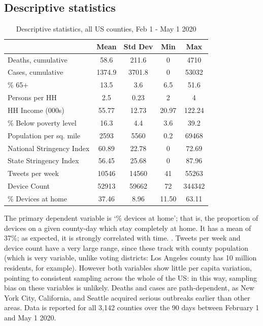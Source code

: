 \documentclass{article}
\begin{document}
\subsection{Descriptive statistics}\label{descrip}
\begin{singlespace}
    \begin{table}[!htb]
    \centering  
  \caption{Descriptive statistics, all US counties, Feb 1 - May 1 2020}
  \begin{tabular}{lcccc}
    \toprule
     & Mean & Std Dev & Min & Max\\
    \midrule
    Deaths, cumulative & 58.6 & 211.6 & 0 & 4710\\
    Cases, cumulative & 1374.9 & 3701.8 & 0 & 53032\\
    \addlinespace
    \% 65+ & 13.5 & 3.6 & 6.5 & 51.6\\
    Persons per HH & 2.5 & 0.23 & 2 & 4\\
    HH Income (000s) & 55.77 & 12.73 & 20.97 & 122.24\\
    \% Below poverty level & 16.3 & 4.4 & 3.6 & 39.2\\
    Population per sq. mile & 2593 & 5560 & 0.2 & 69468\\
    \addlinespace
    National Stringency Index & 60.89 & 22.78 & 0 & 72.69\\
    State Stringency Index & 56.45 & 25.68 & 0 & 87.96\\
    \addlinespace
    Tweets per week & 10546 & 14560 & 41 & 55263\\
    \addlinespace
    Device Count & 52913 & 59662 & 72 & 344342\\
    \% Devices at home & 37.46 & 8.96 & 11.50 & 63.11\\
    \bottomrule
    \end{tabular}
  \end{table}
\end{singlespace}
The primary dependent variable is `\% devices at home'; that is, the proportion of devices on a given county-day which stay completely at home. It has a mean of 37\%; as expected, it is strongly correlated with time. . Tweets per week and device count have a very large range, since these track with county population (which is very variable, unlike voting districts: Los Angeles county has 10 million residents, for example). However both variables show little per capita variation, pointing to consistent sampling across the whole of the US: in this way, sampling bias on these variables is unlikely. Deaths and cases are path-dependent, as New York City, California, and Seattle acquired serious outbreaks earlier than other areas. Data is reported for all 3,142 counties over the 90 days between February 1 and May 1 2020. 
\end{document}
